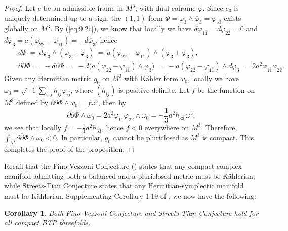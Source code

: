 \documentclass{amsart}
\numberwithin{equation}{section}
\newtheorem{corollary}  [theorem]     {Corollary}
\theoremstyle{definition}
\renewcommand{\1}{\mathds{1}}
\renewcommand{\>}{\rightarrow}
\begin{document}
\begin{proof}
Let $e$ be an admissible frame in $M^3$, with dual coframe $\varphi$. Since $e_3$ is uniquely determined up to a sign, the $(1,1)$-form $\Phi = \varphi_3\wedge \overline{\varphi}_3=\varphi_{3\bar{3}}$ exists globally on $M^3$. By (\ref{eq:9.2c}), we know that locally we have $d\varphi_{1\bar{1}}=d\varphi_{2\bar{2}}=0$ and $d\varphi_3=a(\varphi_{2\bar{2}}-\varphi_{1\bar{1}})=-d\overline{\varphi}_3$, hence
\begin{eqnarray*}
&&  d\Phi \ = \  d\varphi_3\wedge (\varphi_3+\overline{\varphi}_3)  \ = \ a(\varphi_{2\bar{2}}-\varphi_{1\bar{1}}) \wedge (\varphi_3+\overline{\varphi}_3),\\
&& \partial \overline{\partial}\Phi \ = \  - d\partial\Phi \ = \ -d\big( a(\varphi_{2\bar{2}}-\varphi_{1\bar{1}}) \wedge \varphi_3\big)  \ = \ -a(\varphi_{2\bar{2}}-\varphi_{1\bar{1}}) \wedge d\varphi_3 \ = \ 2a^2 \varphi_{1\bar{1}}\varphi_{2\bar{2}}.
\end{eqnarray*}
Given any Hermitian metric $g_0$ on $M^3$ with K\"ahler form $\omega_0$, locally we have $\omega_0=\sqrt{-1} \sum_{i,j} h_{i\bar{j}}\varphi_{i\bar{j}}$, where $(h_{i\bar{j}})$ is positive definite. Let $f$ be the function on $M^3$ defined by $ \partial \overline{\partial}\Phi \wedge \omega_0=f\omega^3$, then by
$$ \partial \overline{\partial}\Phi \wedge \omega_0 =   2a^2\varphi_{1\bar{1}} \varphi_{2\bar{2}} \wedge \omega_0 = -\frac{1}{3}a^2h_{3\bar{3}} \,\omega^3, $$
we see that locally $f=-\frac{1}{3}a^2h_{3\bar{3}}$, hence $f<0$ everywhere on $M^3$. Therefore, $\int_M \partial \overline{\partial}\Phi \wedge \omega_0  <0$. In particular, $g_0$ cannot be pluriclosed as $M^3$ is compact. This completes the proof of the proposition.
\end{proof}

Recall that the Fino-Vezzoni Conjecture (\cite{FV2, FV16}) states that any compact complex manifold admitting both a balanced and a pluriclosed metric must be K\"ahlerian, while Streets-Tian Conjecture \cite{ST} states that any Hermitian-symplectic manifold must be K\"ahlerian. Supplementing Corollary 1.19 of \cite{ZhaoZ24}, we now have the following:

\begin{corollary} \label{cor6.8}
Both Fino-Vezzoni Conjecture and Streets-Tian Conjecture hold for all compact  BTP threefolds.
\end{corollary}
\end{document}
